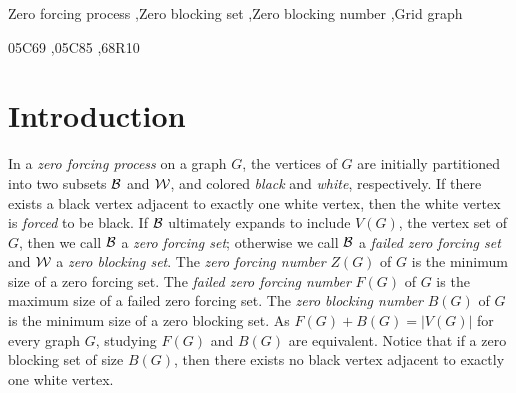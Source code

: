 \documentclass[preprint,12pt]{elsarticle}
\begin{document}
\begin{frontmatter}


\begin{keyword}
Zero forcing process \sep Zero blocking set \sep Zero blocking number \sep Grid graph

\MSC 05C69 \sep 05C85 \sep 68R10

\end{keyword}

\end{frontmatter}




\section{Introduction}\label{sec1}


In a {\em zero forcing process} on a graph $G$,
the vertices of $G$ are initially partitioned into two subsets ${\cal B}$ and ${\cal W}$,
and colored {\em black} and {\em white}, respectively.
If there exists a black vertex adjacent to exactly one white vertex,
then the white vertex is {\em forced} to be black.
If ${\cal B}$ ultimately expands to include $V(G)$, the vertex set of $G$,
then we call ${\cal B}$ a {\em zero forcing set};
otherwise we call ${\cal B}$ a {\em failed zero forcing set}
and ${\cal W}$ a {\em zero blocking set}.
The {\em zero forcing number} $Z(G)$ of $G$ is the minimum size of a zero forcing set.
The {\em failed zero forcing number} $F(G)$ of $G$ is the maximum size of a failed zero forcing set.
The {\em zero blocking number} $B(G)$ of $G$ is the minimum size of a zero blocking set.
As $F(G)+B(G)=|V(G)|$ for every graph $G$, studying $F(G)$ and $B(G)$ are equivalent.
Notice that if a zero blocking set of size $B(G)$,
then there exists no black vertex adjacent to exactly one white vertex.
\end{document}
